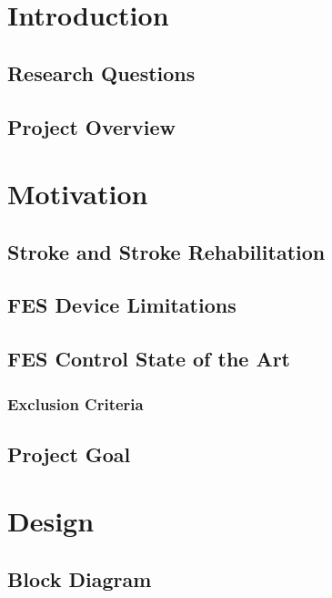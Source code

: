 \documentclass[a4paper,twoside,11pt]{report} %
\begin{document}

\pagecolor{white}
\pagestyle{empty}
\cleardoublepage 

\clearpage 
\pagestyle{main}

\clearpage 

\clearpage 

\cleardoublepage 
\tableofcontents
\cleardoublepage 

\chapter{Introduction}
\section{Research Questions}
\section{Project Overview}
\chapter{Motivation}
\section{Stroke and Stroke Rehabilitation}
\section{FES Device Limitations}
\section{FES Control State of the Art}
\subsection{Exclusion Criteria}
\section{Project Goal}
\chapter{Design}
\section{Block Diagram}
\end{document}
